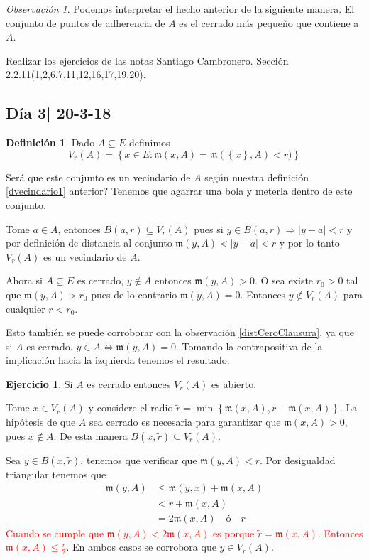 \documentclass[12pt]{article}
\theoremstyle{plain}
\theoremstyle{definition}
\newtheorem{Def}[Th]{Definición}       %
\newtheorem{Ej}[Th]{Ejercicio}
\theoremstyle{remark}
\newtheorem{Rmk}[Th]{Observación}      %
\numberwithin{equation}{section}
\newcommand{\mm}{\mathfrak{m}}      %
\renewcommand{\leq}{\leqslant}      %
\renewcommand{\:}{\colon}           %
\newcommand{\conj}[1]{\left\lbrace#1\right\rbrace}
\begin{document}
\begin{multicols}{2}
\begin{Rmk}
  Podemos interpretar el hecho anterior de la siguiente manera. El conjunto de puntos de adherencia de $A$ es el cerrado más pequeño que contiene a $A$.
\end{Rmk}
Realizar los ejercicios de las notas Santiago Cambronero. Sección 2.2.11(1,2,6,7,11,12,16,17,19,20).

\subsection{Día 3| 20-3-18}

\begin{Def}\label{dvecindario2}
  Dado $A\subseteq E$ definimos
  $$V_r(A)=\conj{x\in E\colon \mm(x,A)=\mm(\conj{x},A)<r)}$$
\end{Def}
Será que este conjunto es un vecindario de $A$ según nuestra definición \ref{dvecindario1} anterior?
Tenemos que agarrar una bola y meterla dentro de este conjunto.\par
Tome $a\in A$, entonces $B(a,r)\subseteq V_r(A)$ pues si $y\in B(a,r)\Rightarrow |y-a|<r$ y por definición de distancia al conjunto $\mm(y,A)<|y-a|<r$ y por lo tanto $V_r(A)$ es un vecindario de $A$.\par
Ahora si $A\subseteq E$ es cerrado, $y\not\in A$ entonces $\mm(y,A)>0$. O sea existe $r_0>0$ tal que $\mm(y,A)>r_0$ pues de lo contrario $\mm(y,A)=0$. Entonces $y\not\in V_r(A)$ para cualquier $r<r_0$.\par Esto también se puede corroborar con la observación \ref{distCeroClausura}, ya que si $A$ es cerrado, $y\in A\iff\mm(y,A)=0$. Tomando la contrapositiva de la implicación hacia la izquierda tenemos el resultado.
\begin{Ej}
  Si $A$ es cerrado entonces $V_r(A)$ es abierto.
\end{Ej}

\begin{ptcb}
Tome $x\in V_r(A)$ y considere el radio $\tilde{r}=\min\conj{\mm(x,A),r-\mm(x,A)}$. La hipótesis de que $A$ sea cerrado es necesaria para garantizar que $\mm(x,A)>0$, pues $x\not\in A$. De esta manera $B(x,\tilde{r})\subseteq V_r(A)$. \par
Sea $y\in B(x,\tilde{r})$, tenemos que verificar que $\mm(y,A)<r$. Por desigualdad triangular tenemos que
\begin{align*}
 \mm(y,A)&\leq\mm(y,x)+\mm(x,A)\\
 &<\tilde{r}+\mm(x,A) \\
 &=2\mm(x,A)\quad\text{ó}\quad r
\end{align*}
 \textcolor{red}{Cuando se cumple que $\mm(y,A)<2\mm(x,A)$ es porque $\tilde{r}=\mm(x,A)$. Entonces $\mm(x,A)\leq\frac{r}{2}$}. En ambos casos se corrobora que $y\in V_r(A)$.
\end{ptcb}


\end{multicols}
\end{document}
